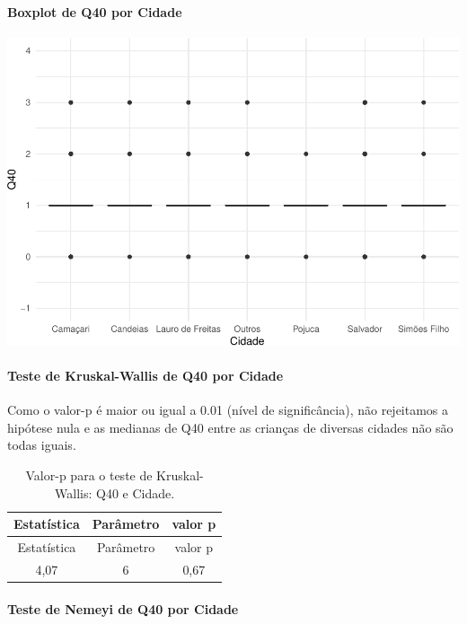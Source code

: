\documentclass[]{article}
\let\oldparagraph\paragraph
\renewcommand{\paragraph}[1]{\oldparagraph{#1}\mbox{}}
\begin{document}
\hypertarget{boxplot-de-q40-por-cidade}{%
\paragraph{Boxplot de Q40 por Cidade}\label{boxplot-de-q40-por-cidade}}

\begin{center}\includegraphics[width=0.75\linewidth]{relatorio_covid19_files/figure-latex/unnamed-chunk-1551-1} \end{center}

\hypertarget{teste-de-kruskal-wallis-de-q40-por-cidade}{%
\paragraph{Teste de Kruskal-Wallis de Q40 por Cidade}\label{teste-de-kruskal-wallis-de-q40-por-cidade}}

Como o valor-p é maior ou igual a 0.01 (nível de significância), não rejeitamos a hipótese nula e as medianas de Q40 entre as crianças de diversas cidades não são todas iguais.

\begin{longtable}[]{@{}ccc@{}}
\caption{\label{tab:unnamed-chunk-1553}Valor-p para o teste de Kruskal-Wallis: Q40 e Cidade.}\tabularnewline
\toprule
Estatística & Parâmetro & valor p\tabularnewline
\midrule
\endfirsthead
\toprule
Estatística & Parâmetro & valor p\tabularnewline
\midrule
\endhead
4,07 & 6 & 0,67\tabularnewline
\bottomrule
\end{longtable}

\hypertarget{teste-de-nemeyi-de-q40-por-cidade}{%
\paragraph{Teste de Nemeyi de Q40 por Cidade}\label{teste-de-nemeyi-de-q40-por-cidade}}
\end{document}
